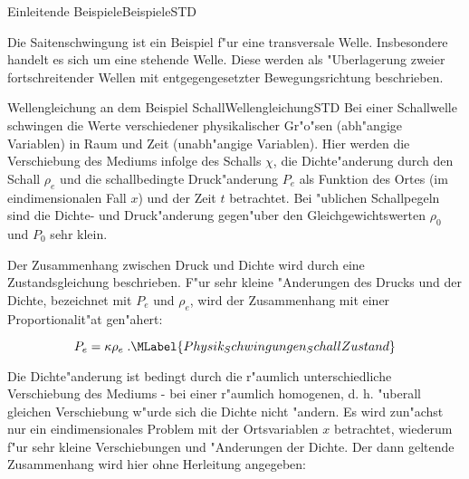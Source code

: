 \begin{MXContent}{Einleitende Beispiele}{Beispiele}{STD}

Die Saitenschwingung ist ein Beispiel f"ur eine transversale Welle. Insbesondere handelt es sich um eine stehende Welle. Diese werden als "Uberlagerung zweier fortschreitender Wellen mit entgegengesetzter Bewegungsrichtung beschrieben.

\end{MXContent}


\begin{MXContent}{Wellengleichung an dem Beispiel Schall}{Wellengleichung}{STD}%
Bei einer Schallwelle schwingen die Werte verschiedener physikalischer Gr"o"sen (abh"angige Variablen) in Raum und Zeit (unabh"angige Variablen). Hier werden die Verschiebung des Mediums infolge des Schalls $\chi$, die Dichte"anderung durch den Schall $\rho_e$ und die schallbedingte Druck"anderung $P_e$ als Funktion des Ortes (im eindimensionalen Fall $x$) und der Zeit $t$ betrachtet. Bei "ublichen Schallpegeln sind die Dichte- und Druck"anderung gegen"uber den Gleichgewichtswerten $\rho_0$ und $P_0$ sehr klein. 

\begin{MInfo}
Der Zusammenhang zwischen Druck und Dichte wird durch eine Zustandsgleichung beschrieben. F"ur sehr kleine "Anderungen des Drucks und der Dichte, bezeichnet mit $P_e$ und $\rho_e$, wird der Zusammenhang mit einer Proportionalit"at gen"ahert:

\begin{equation}
  P_e = \kappa \rho_e\; .\MLabel{Physik_Schwingungen_SchallZustand}
\end{equation}

\end{MInfo}

Die Dichte"anderung ist bedingt durch die r"aumlich unterschiedliche Verschiebung des Mediums - bei einer r"aumlich homogenen, d. h. "uberall gleichen Verschiebung w"urde sich die Dichte nicht "andern. Es wird zun"achst nur ein eindimensionales Problem mit der Ortsvariablen $x$ betrachtet, wiederum f"ur sehr kleine Verschiebungen und "Anderungen der Dichte. Der dann geltende Zusammenhang wird hier ohne Herleitung angegeben:


\end{MXContent}
